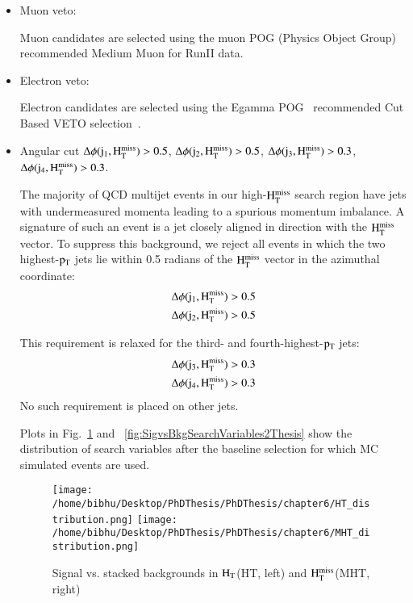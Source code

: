 \begin{itemize}
\item Muon veto:

  Muon candidates are selected using the muon POG (Physics Object Group)  ~\cite{MuonPOG} recommended 
  Medium Muon for RunII data.


\item Electron veto:

  Electron candidates are selected using the Egamma POG~\cite{ElectronPOG} recommended 
  Cut Based VETO selection~\cite{ElectronPOG}.



\item Angular cut $\rm \Delta\phi(j_{1}, H_{T}^{miss}) > 0.5$,
  $\rm \Delta\phi(j_{2},H_{T}^{miss}) > 0.5$, $\rm \Delta\phi(j_{3},H_{T}^{miss}) > 0.3$, $\rm \Delta\phi(j_{4},H_{T}^{miss}) > 0.3$.

  The majority of QCD multijet events in our high-$\rm H_{T}^{miss}$ search region
  have jets with undermeasured momenta leading to a spurious
  momentum imbalance.  A signature of such an event is a jet closely
  aligned in direction with the $\rm H_{T}^{miss}$ vector.  To suppress this background, we reject
  all events in which the two highest-$\rm p_{T}$ jets lie within 0.5 radians
  of the $\rm H_{T}^{miss}$ vector in the azimuthal coordinate:
\begin{align} 
\rm \Delta\phi(j_{1}, H_{T}^{miss}) & >  0.5\\
\rm \Delta\phi(j_{2}, H_{T}^{miss}) & >  0.5
\end{align} 

This requirement is relaxed for the third- and fourth-highest-$\rm p_{T}$
  jets:
\begin{align} 
\rm \Delta\phi(j_{3}, H_{T}^{miss}) & >  0.3\\
\rm \Delta\phi(j_{4}, H_{T}^{miss}) & >  0.3
 \end{align} 
No such requirement is placed on other jets.


Plots in Fig.~\ref{fig:SigvsBkgSearchVariables1Thesis} and ~\ref{fig:SigvsBkgSearchVariables2Thesis} show the  distribution of search variables after the baseline selection for which MC simulated events are used.

\begin{figure}[h]
\begin{center}
\texttt{[image: /home/bibhu/Desktop/PhDThesis/PhDThesis/chapter6/HT\_distribution.png]}
\texttt{[image: /home/bibhu/Desktop/PhDThesis/PhDThesis/chapter6/MHT\_distribution.png]}
\caption{\label{fig:SigvsBkgSearchVariables1Thesis} Signal vs. stacked backgrounds in $\rm H_{T}$(HT, left) and $\rm H_{T}^{miss}$(MHT, right)}
\end{center}
\end{figure}


\end{itemize}
